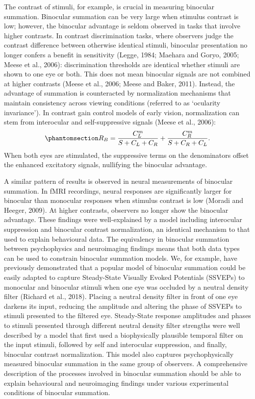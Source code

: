 \documentclass[
  12pt,
]{article}
\begin{document}
The contrast of stimuli, for example, is crucial in measuring binocular
summation. Binocular summation can be very large when stimulus contrast
is low; however, the binocular advantage is seldom observed in tasks
that involve higher contrasts. In contrast discrimination tasks, where
observers judge the contrast difference between otherwise identical
stimuli, binocular presentation no longer confers a benefit in
sensitivity (Legge, 1984; Maehara and Goryo, 2005; Meese et al., 2006):
discrimination thresholds are identical whether stimuli are shown to one
eye or both. This does not mean binocular signals are not combined at
higher contrasts (Meese et al., 2006; Meese and Baker, 2011). Instead,
the advantage of summation is counteracted by normalization mechanisms
that maintain consistency across viewing conditions (referred to as
`ocularity invariance'). In contrast gain control models of early
vision, normalization can stem from interocular and self-suppressive
signals (Meese et al., 2006):
\begin{equation}\phantomsection\label{eq-intoMath2}{
R_B = \frac{C_L^m}{S+C_L+C_R} + \frac{C_R^m}{S+C_R+C_L}.
}\end{equation} When both eyes are stimulated, the suppressive terms on
the denominators offset the enhanced excitatory signals, nullifying the
binocular advantage.

A similar pattern of results is observed in neural measurements of
binocular summation. In fMRI recordings, neural responses are
significantly larger for binocular than monocular responses when
stimulus contrast is low (Moradi and Heeger, 2009). At higher contrasts,
observers no longer show the binocular advantage. These findings were
well-explained by a model including interocular suppression and
binocular contrast normalization, an identical mechanism to that used to
explain behavioural data. The equivalency in binocular summation between
psychophysics and neuroimaging findings means that both data types can
be used to constrain binocular summation models. We, for example, have
previously demonstrated that a popular model of binocular summation
could be easily adapted to capture Steady-State Visually Evoked
Potentials (SSVEPs) to monocular and binocular stimuli when one eye was
occluded by a neutral density filter (Richard et al., 2018). Placing a
neutral density filter in front of one eye darkens its input, reducing
the amplitude and altering the phase of SSVEPs to stimuli presented to
the filtered eye. Steady-State response amplitudes and phases to stimuli
presented through different neutral density filter strengths were well
described by a model that first used a biophysically plausible temporal
filter on the input stimuli, followed by self and interocular
suppression, and finally, binocular contrast normalization. This model
also captures psychophysically measured binocular summation in the same
group of observers. A comprehensive description of the processes
involved in binocular summation should be able to explain behavioural
and neuroimaging findings under various experimental conditions of
binocular summation.
\end{document}
